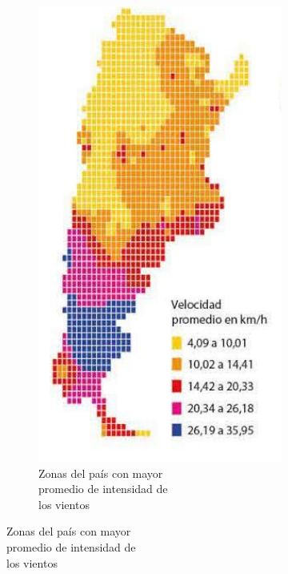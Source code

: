 \begin{figure}[H]
\begin{subfigure}{0.4\textwidth}
\end{subfigure}
\begin{subfigure}{0.4\textwidth}
\includegraphics[width=1\linewidth]{Intro/Screenshot_2.png}
\caption{Zonas del país con mayor \\promedio de intensidad de \\los vientos}
\label{fig:subim2}
\end{subfigure}
\label{fig:image2}
\end{figure}

